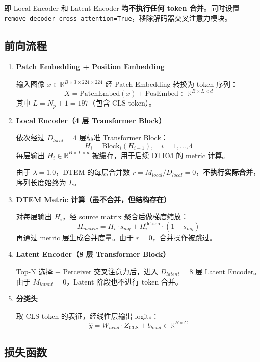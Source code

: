 \documentclass[a4paper,11pt]{article}
\begin{document}
即 Local Encoder 和 Latent Encoder \textbf{均不执行任何 token 合并}。同时设置 \texttt{remove\_decoder\_cross\_attention=True}，移除解码器交叉注意力模块。

\subsection{前向流程}

\begin{enumerate}
    \item \textbf{Patch Embedding + Position Embedding}
    
    输入图像 $x \in \mathbb{R}^{B \times 3 \times 224 \times 224}$ 经 Patch Embedding 转换为 token 序列：
    \[
        X = \text{PatchEmbed}(x) + \text{PosEmbed} \in \mathbb{R}^{B \times L \times d}
    \]
    其中 $L = N_p + 1 = 197$（包含 CLS token）。
    
    \item \textbf{Local Encoder（4 层 Transformer Block）}
    
    依次经过 $D_{local}=4$ 层标准 Transformer Block：
    \[
        H_i = \text{Block}_i(H_{i-1}), \quad i = 1, \dots, 4
    \]
    每层输出 $H_i \in \mathbb{R}^{B \times L \times d}$ 被缓存，用于后续 DTEM 的 metric 计算。
    
    由于 $\lambda=1.0$，DTEM 的每层合并数 $r = M_{local} / D_{local} = 0$，\textbf{不执行实际合并}，序列长度始终为 $L$。

    \item \textbf{DTEM Metric 计算（虽不合并，但结构存在）}
    
    对每层输出 $H_i$，经 source matrix 聚合后做梯度缩放：
    \[
        H_{metric} = H_i \cdot s_{mg} + H_i^{\text{detach}} \cdot (1 - s_{mg})
    \]
    再通过 metric 层生成合并度量。由于 $r=0$，合并操作被跳过。

    \item \textbf{Latent Encoder（8 层 Transformer Block）}
    
    Top-N 选择 + Perceiver 交叉注意力后，进入 $D_{latent}=8$ 层 Latent Encoder。由于 $M_{latent}=0$，Latent 阶段也不进行 token 合并。

    \item \textbf{分类头}
    
    取 CLS token 的表征，经线性层输出 logits：
    \[
        \hat{y} = W_{head} \cdot Z_{\text{CLS}} + b_{head} \in \mathbb{R}^{B \times C}
    \]
\end{enumerate}

\subsection{损失函数}
\end{document}
